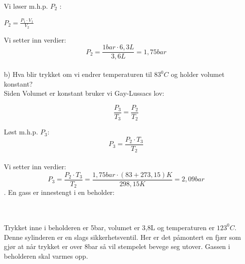 \documentclass[12pt,a4paper]{article}
\begin{document}
Vi løser m.h.p. $P_2$ :
\begin{center}
    $P_2=\frac{P_1\cdot V_1}{V_2}$
\end{center}
Vi setter inn verdier:\\

    $$P_2=\frac{1bar\cdot 6,3L}{3,6L}=1,75bar$$\\

\noindent b) Hva blir trykket om vi endrer temperaturen til $83^0C$ og holder volumet konstant?\\
Siden Volumet er konstant bruker vi Gay-Lussacs lov:

    $$\frac{P_3}{T_3}=\frac{P_2}{T_2}$$

Løst m.h.p. $P_3$: 
$$P_3=\frac{P_2\cdot T_3}{T_2}$$\\
Vi setter inn verdier:\\
$$P_3=\frac{P_2\cdot T_3}{T_2}=\frac{1,75bar \cdot (83+273,15)K}{298,15K}=2,09bar$$\newpage{}. En gass er innestengt i en beholder:
     \begin{figure}[h]
    \vspace{1cm}  %
\end{figure}
\\\\Trykket inne i beholderen er 5bar, volumet er 3,8L og temperaturen er $123^0C$.  Denne sylinderen er en slags sikkerhetsventil.  Her er det påmontert en fjær som gjør at når trykket er over 8bar så vil stempelet bevege seg utover. Gassen i beholderen skal varmes opp.\\\\
\end{document}
